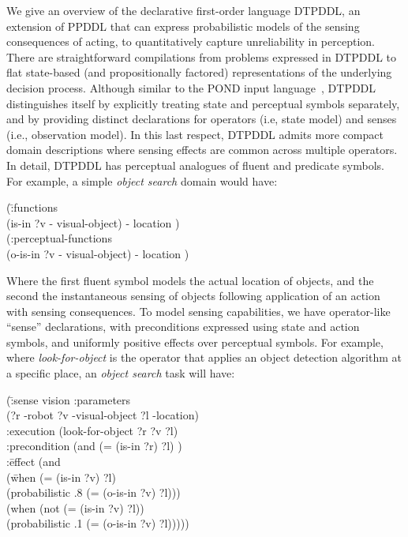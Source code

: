 


We give an overview of the declarative first-order language DTPDDL, an
extension of PPDDL that can express probabilistic models of the
sensing consequences of acting, to quantitatively capture
unreliability in perception. There are straightforward compilations
from problems expressed in DTPDDL to flat state-based (and
propositionally factored) representations of the underlying decision
process. Although similar to the POND input
language~\cite{Bryce:2008}, DTPDDL distinguishes itself by explicitly
treating state and perceptual symbols separately, and by providing
distinct declarations for operators (i.e, state model) and senses
(i.e., observation model). In this last respect, DTPDDL admits more
compact domain descriptions where sensing effects are common across
multiple operators. In detail, DTPDDL has perceptual analogues of
fluent and predicate symbols. For example, a simple {\em object
search} domain would have:

\small
\begin{tabtt}
(\=:functions\\
  \> (is-in ?v - visual-object) - location )\\
(:perceptual-functions\\
  \> (o-is-in ?v - visual-object) - location )
\end{tabtt}
\normalsize

\noindent Where the first fluent symbol models the actual location of
objects, and the second the instantaneous sensing of objects
following application of an action with sensing consequences.
To model sensing capabilities, we have operator-like ``sense''
declarations, with preconditions expressed using state and action
symbols, and uniformly positive effects over perceptual symbols. For
example, where {\em look-for-object} is the operator that applies an
object detection algorithm at a specific place, an {\em
object search} task will have:

\small
\begin{tabtt}
(\= :sense vision  :parameters \+ \\
  (?r -robot ?v -visual-object ?l -location) \\
 :execution  (look-for-object ?r ?v ?l) \\
 :precondition (and (= (is-in ?r) ?l) ) \\
 :\=effect (and \+\\
    (\= when (= (is-in ?v) ?l)\\
    \>(probabilistic .8 (= (o-is-in ?v) ?l))) \\
   (when (not (= (is-in ?v) ?l)) \\
    \>(probabilistic .1 (= (o-is-in ?v) ?l))))) \\
\end{tabtt}
\normalsize
\vspace{-1ex}

